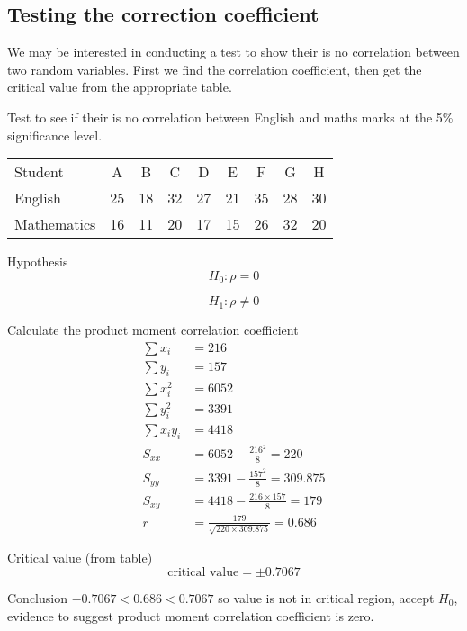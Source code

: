     \subsection{Testing the correction coefficient}
        We may be interested in conducting a test to show their is no correlation between two random variables. First we find the correlation coefficient, then get the critical value from the appropriate table.

        \begin{example}
        {
            Test to see if their is no correlation between English and maths marks at the 5\% significance level.

            \begin{center}
            \begin{tabular}{l|c|c|c|c|c|c|c|c}
            Student        & A  & B  & C  & D  & E  & F  & G  & H  \\
            English        & 25 & 18 & 32 & 27 & 21 & 35 & 28 & 30 \\
            Mathematics    & 16 & 11 & 20 & 17 & 15 & 26 & 32 & 20 \\
            \end{tabular}
            \end{center}
        }

        \begin{step}{Hypothesis} 
        $$H_0: \rho = 0$$

        $$H_1: \rho \ne 0$$
        \end{step}

        \begin{step}{Calculate the product moment correlation coefficient}
        \begin{align*}
        \sum{x_i} &= 216\\
        \sum{y_i} &= 157\\
        \sum{x_i^2} &= 6052\\
        \sum{y_i^2} &= 3391\\
        \sum{x_i y_i} &= 4418\\
        S_{xx} &= 6052 - \frac{216^2}{8} = 220\\
        S_{yy} &= 3391 - \frac{157^2}{8} = 309.875\\
        S_{xy} &= 4418 - \frac{216 \times 157}{8} = 179\\
        r &= \frac{179}{\sqrt{220 \times 309.875}} = 0.686
        \end{align*}
        \end{step}

        \begin{step}{Critical value (from table)}
        $$
        \text{critical value} = \pm 0.7067
        $$
        \end{step}

        \begin{step}{Conclusion}
        $-0.7067 < 0.686 < 0.7067$ so value is not in critical region, accept $H_0$, evidence to suggest product moment correlation coefficient is zero.
        \end{step}

        \end{example}